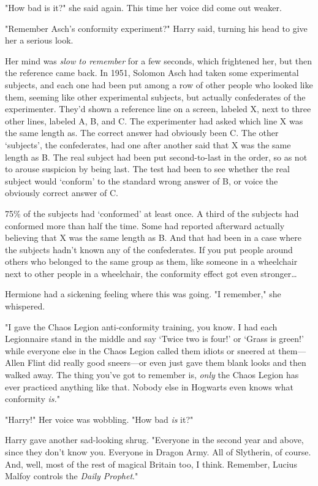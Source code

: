 "How bad is it?" she said again. This time her voice did come out weaker.

"Remember Asch's conformity experiment?" Harry said, turning his head to give
her a serious look.

Her mind was \emph{slow to remember} for a few seconds, which frightened her,
but then the reference came back. In 1951, Solomon Asch had taken some
experimental subjects, and each one had been put among a row of other people
who looked like them, seeming like other experimental subjects, but actually
confederates of the experimenter. They'd shown a reference line on a screen,
labeled X, next to three other lines, labeled A, B, and C. The experimenter had
asked which line X was the same length as. The correct answer had obviously
been C. The other `subjects', the confederates, had one after another said that
X was the same length as B. The real subject had been put second-to-last in the
order, so as not to arouse suspicion by being last. The test had been to see
whether the real subject would `conform' to the standard wrong answer of B, or
voice the obviously correct answer of C.

75\% of the subjects had `conformed' at least once. A third of the subjects had
conformed more than half the time. Some had reported afterward actually
believing that X was the same length as B. And that had been in a case where
the subjects hadn't known any of the confederates. If you put people around
others who belonged to the same group as them, like someone in a wheelchair
next to other people in a wheelchair, the conformity effect got even
stronger{\ldots}

Hermione had a sickening feeling where this was going. "I remember," she
whispered.

"I gave the Chaos Legion anti-conformity training, you know. I had each
Legionnaire stand in the middle and say `Twice two is four!' or `Grass is
green!' while everyone else in the Chaos Legion called them idiots or sneered
at them---Allen Flint did really good sneers---or even just gave them blank
looks and then walked away. The thing you've got to remember is, \emph{only}
the Chaos Legion has ever practiced anything like that. Nobody else in Hogwarts
even knows what conformity \emph{is.}"

"Harry!" Her voice was wobbling. "How bad \emph{is} it?"

Harry gave another sad-looking shrug. "Everyone in the second year and above,
since they don't know you. Everyone in Dragon Army. All of Slytherin, of
course. And, well, most of the rest of magical Britain too, I think. Remember,
Lucius Malfoy controls the \emph{Daily Prophet}."

